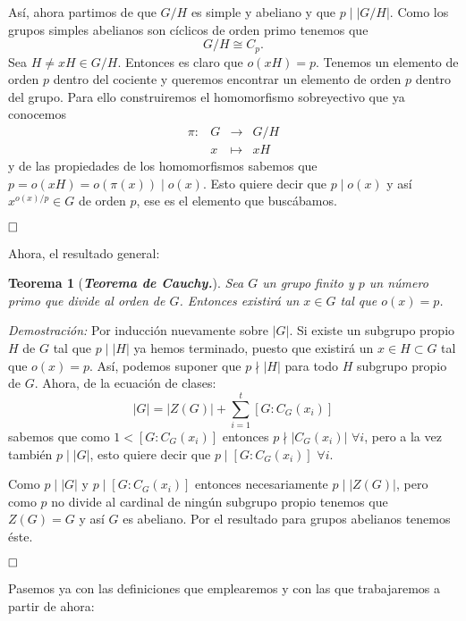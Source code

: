 \documentclass[12pt]{article}
\newtheorem{theorem}{Teorema}[section]
\begin{document}
Así, ahora partimos de que $G/H$ es simple y abeliano y que  $p \mid |G/H|$. Como los grupos simples abelianos son cíclicos de orden primo tenemos que $$G/H \cong C_{p}.$$ Sea $H \neq xH \in G/H$. Entonces es claro que $o(xH) = p$. Tenemos un elemento de orden $p$ dentro del cociente y queremos encontrar un elemento de orden $p$ dentro del grupo. Para ello construiremos el homomorfismo sobreyectivo que ya conocemos $$\begin{array}{rccl}
\pi \colon &G & \longrightarrow & G/H\\
&x & \longmapsto &xH
\end{array}
$$ y de las propiedades de los homomorfismos sabemos que $p = o(xH) = o(\pi(x)) \mid o(x)$. Esto quiere decir que $p \mid o(x)$ y así $x^{o(x)/p} \in G$ de orden $p$, ese es el elemento que buscábamos.

$\hfill \square$

Ahora, el resultado general:

\begin{theorem}[\textbf{\textit{Teorema de Cauchy.}}]
Sea $G$ un grupo finito y $p$ un número primo que divide al orden de $G$. Entonces existirá un $x \in G$ tal que $o(x) = p$.
\end{theorem}
\emph{Demostración: } Por inducción nuevamente sobre $|G|$. Si existe un subgrupo propio $H$ de $G$ tal que $p \mid |H|$ ya hemos terminado, puesto que existirá un $x \in H \subset G$ tal que $o(x) = p$. Así, podemos suponer que $p \nmid |H|$ para todo $H$ subgrupo propio de $G$. Ahora, de la ecuación de clases: $$|G| = |Z(G)| + \sum_{i = 1}^{t}  \left[ G:C_{G}(x_{i}) \right]$$ sabemos que como $1 <  \left[ G:C_{G}(x_{i}) \right]$ entonces $p \nmid |C_{G}(x_{i})|$ $\forall i$, pero a la vez también $p \mid |G|$, esto quiere decir que $p \mid  \left[ G:C_{G}(x_{i}) \right]$ $\forall i$.

Como $p \mid |G|$ y $p \mid  \left[ G:C_{G}(x_{i}) \right]$ entonces necesariamente $p \mid |Z(G)|$, pero como $p$ no divide al cardinal de ningún subgrupo propio tenemos que $Z(G) = G$ y así $G$ es abeliano. Por el resultado para grupos abelianos tenemos éste.

$\hfill \square$

Pasemos ya con las definiciones que emplearemos y con las que trabajaremos a partir de ahora:
\end{document}
